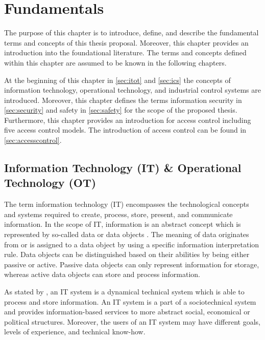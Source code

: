 \chapter{Fundamentals}
\label{ch:fundamentals}
The purpose of this chapter is to introduce, define, and describe the fundamental terms and concepts of this thesis proposal.
Moreover, this chapter provides an introduction into the foundational literature.
The terms and concepts defined within this chapter are assumed to be known in the following chapters. 

At the beginning of this chapter in \autoref{sec:itot} and \autoref{sec:ics} the concepts of information technology, operational technology, and industrial control systems are introduced.
Moreover, this chapter defines the terms information security in \autoref{sec:security} and safety in \autoref{sec:safety} for the scope of the proposed thesis.
Furthermore, this chapter provides an introduction for access control including five access control models.
The introduction of access control can be found in \autoref{sec:accesscontrol}.

\section{Information Technology (IT) \& Operational Technology (OT)}
\label{sec:itot}
The term information technology (IT) encompasses the technological concepts and systems required to create, process, store, present, and communicate information.
In the scope of IT, information is an abstract concept which is represented by so-called data or data objects \cite{Eckert2023}.
The meaning of data originates from or is assigned to a data object by using a specific information interpretation rule.
Data objects can be distinguished based on their abilities by being either passive or active.
Passive data objects can only represent information for storage, whereas active data objects can store and process information.

As stated by \citeauthor{Eckert2023} \cite{Eckert2023}, an IT system is a dynamical technical system which is able to process and store information.
An IT system is a part of a sociotechnical system and provides information-based services to more abstract social, economical or political structures.
Moreover, the users of an IT system may have different goals, levels of experience, and technical know-how.


